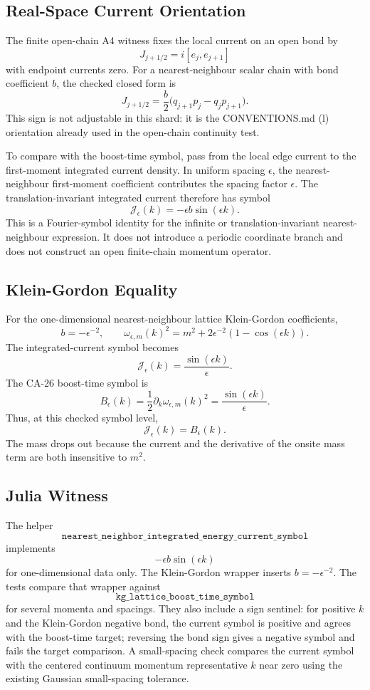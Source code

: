 \subsection{Real-Space Current Orientation}

The finite open-chain A4 witness fixes the local current on an open bond by
\[
  J_{j+1/2}=i[e_j,e_{j+1}]
\]
with endpoint currents zero.  For a nearest-neighbour scalar chain with bond
coefficient \(b\), the checked closed form is
\[
  J_{j+1/2}
  =
  \frac b2\bigl(q_{j+1}p_j-q_jp_{j+1}\bigr).
\]
This sign is not adjustable in this shard: it is the CONVENTIONS.md (l)
orientation already used in the open-chain continuity test.

To compare with the boost-time symbol, pass from the local edge current to the
first-moment integrated current density.  In uniform spacing \(\epsilon\), the
nearest-neighbour first-moment coefficient contributes the spacing factor
\(\epsilon\).  The translation-invariant integrated current therefore has
symbol
\[
  \mathcal J_\epsilon(k)
  =
  -\epsilon b\sin(\epsilon k).
\]
This is a Fourier-symbol identity for the infinite or translation-invariant
nearest-neighbour expression.  It does not introduce a periodic coordinate
branch and does not construct an open finite-chain momentum operator.

\subsection{Klein-Gordon Equality}

For the one-dimensional nearest-neighbour lattice Klein-Gordon coefficients,
\[
  b=-\epsilon^{-2},
  \qquad
  \omega_{\epsilon,m}(k)^2
  =
  m^2+2\epsilon^{-2}(1-\cos(\epsilon k)).
\]
The integrated-current symbol becomes
\[
  \mathcal J_\epsilon(k)
  =
  \frac{\sin(\epsilon k)}{\epsilon}.
\]
The CA-26 boost-time symbol is
\[
  B_\epsilon(k)
  =
  \frac12\partial_k\omega_{\epsilon,m}(k)^2
  =
  \frac{\sin(\epsilon k)}{\epsilon}.
\]
Thus, at this checked symbol level,
\[
  \mathcal J_\epsilon(k)=B_\epsilon(k).
\]
The mass drops out because the current and the derivative of the onsite mass
term are both insensitive to \(m^2\).

\subsection{Julia Witness}

The helper
\[
  \texttt{nearest\_neighbor\_integrated\_energy\_current\_symbol}
\]
implements
\[
  -\epsilon b\sin(\epsilon k)
\]
for one-dimensional data only.  The Klein-Gordon wrapper inserts
\(b=-\epsilon^{-2}\).  The tests compare that wrapper against
\[
  \texttt{kg\_lattice\_boost\_time\_symbol}
\]
for several momenta and spacings.  They also include a sign sentinel:
for positive \(k\) and the Klein-Gordon negative bond, the current symbol is
positive and agrees with the boost-time target; reversing the bond sign gives a
negative symbol and fails the target comparison.  A small-spacing check compares
the current symbol with the centered continuum momentum representative \(k\)
near zero using the existing Gaussian small-spacing tolerance.

